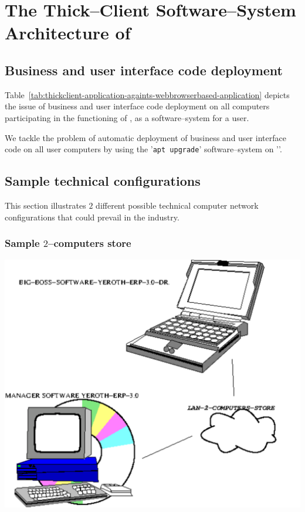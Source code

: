 \chapter{The Thick--Client Software--System Architecture of \yerotherpblack}


\section{Business and user interface code deployment}

Table~\ref{tab:thickclient-application-againts-webbrowserbased-application}
depicts the issue of business and user
interface code deployment on all computers
participating in the functioning of \yerotherpblack,
as a software--system for a user.

We tackle the problem of automatic deployment of
business and user interface code on all user
computers by using the '\texttt{apt upgrade}'
software--system on '\debianlinux'.


\section{Sample technical configurations}

This section illustrates $2$ different possible
technical computer network configurations that
could prevail in the industry. 

\newpage

\subsection{Sample $2$--computers store}

\begin{center}
\includegraphics[scale=0.7]{images/yeroth-erp-sample-2-computers-store.pdf}
\label{fig:sample-two-computers-store}
\end{center}


